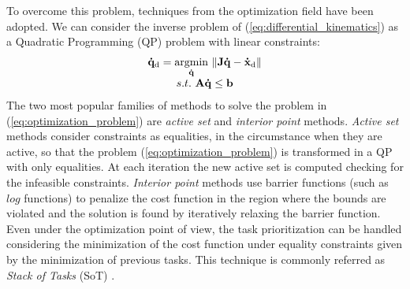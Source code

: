 To overcome this problem, techniques from the optimization field have been adopted.
We can consider the inverse problem of (\ref{eq:differential_kinematics}) as a Quadratic Programming (QP) problem with linear constraints:
\begin{equation} 
\label{eq:optimization_problem}
\begin{array}{c}
\mathbf{\dot{q}}_\text{d} = \underset{\mathbf{\dot{q}}}{\operatorname{argmin}} \ \Arrowvert \mathbf{J} \mathbf{\dot{q}}-\mathbf{\dot{x}}_\text{d} \Arrowvert\\
s.t. \ \mathbf{A}\mathbf{\dot{q}} \leq \mathbf{b}
\end{array}
\end{equation}
The two most popular families of methods to solve the problem in (\ref{eq:optimization_problem}) are \emph{active set} and \emph{interior point} methods. 
\emph{Active set} methods consider constraints as equalities, in the circumstance when they are active, so that the problem (\ref{eq:optimization_problem}) is transformed in a QP with only equalities. At each iteration the new active set is computed checking for the infeasible constraints.
\emph{Interior point} methods use barrier functions (such as $log$ functions) to penalize the cost function in the region where the bounds are violated and the solution is found by iteratively relaxing the barrier function.
Even under the optimization point of view, the task prioritization can be handled considering the minimization of the cost function under equality constraints given by the minimization of previous tasks. This technique is commonly referred as \emph{Stack of Tasks} (SoT) \cite{mansard:icar:09}. 

